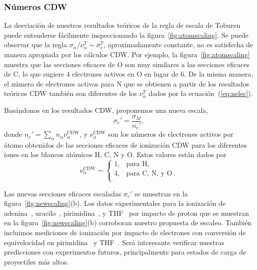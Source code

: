 \subsubsection{Números CDW}
\label{subsec:CDW}

La desviación de nuestros resultados teóricos de la regla de escala de 
Toburen puede entenderse fácilmente inspeccionando la
figura~\ref{fig:atomscaling}. Se puede observar que la regla 
$\sigma_{\alpha}/\nu_{\alpha}^T\sim \sigma_{e}^T$, aproximadamente 
constante, no es satisfecha de manera apropiada por los cálculos CDW. 
Por ejemplo, la figura~\ref{fig:atomscaling} muestra que las secciones
eficaces de O son muy similares a las secciones eficaces de C, lo que 
sugiere 4 electrones activos en O en lugar de 6. De la misma manera, el 
número de electrones activos para N que se obtienen a partir de los 
resultados teóricos CDW también son diferentes de los $\nu_{\alpha}^T$ 
dados por la ecuación~(\ref{eq:nelec}).

Basándonos en los resultados CDW, proponemos una nueva escala,
\begin{equation}
\sigma_{e}'=\frac{\sigma_M}{n_e'},
\label{32} 
\end{equation}
donde $n_e'=\sum_{\alpha}n_{\alpha}\nu_{\alpha}^{\text{CDW}}$, y
$\nu_{\alpha}^{\text{CDW}}$ son los números de electrones activos 
por átomo obtenidos de las secciones eficaces de ionización CDW para los 
diferentes iones en los blancos atómicos H, C, N y O. Estos valores están 
dados por
\begin{equation}
\nu_{\alpha }^{\text{CDW}} \sim\left\{ 
\begin{array}{ll}
1, & \text{para H,} \\
4, & \text{para C, N, y O}\,. \\ 
\end{array}
\right. 
\label{eq:scalingCDW}
\end{equation}

Las nuevas secciones eficaces escaladas $\sigma_{e}'$ se muestran en la
figura~\ref{fig:newscaling}(b). Los datos experimentales para la 
ionización de adenina~\cite{iriki2011}, uracilo~\cite{itoh2013}, 
pirimidina~\cite{wolff2014}, y THF~\cite{wang2016} por impacto de proton 
que se muestran en la figura~\ref{fig:newscaling}(b) corroboran nuestro
propuesta de escaleo. También incluimos mediciones de ionización por 
impacto de electrones con conversión de equivelocidad en 
pirimidina~\cite{bug2017} y THF~\cite{bug2017,wolf2019,fuss2009}. 
Será interesante verificar nuestras predicciones con experimentos 
futuros, principalmente para estados de carga de proyectiles más altos.

